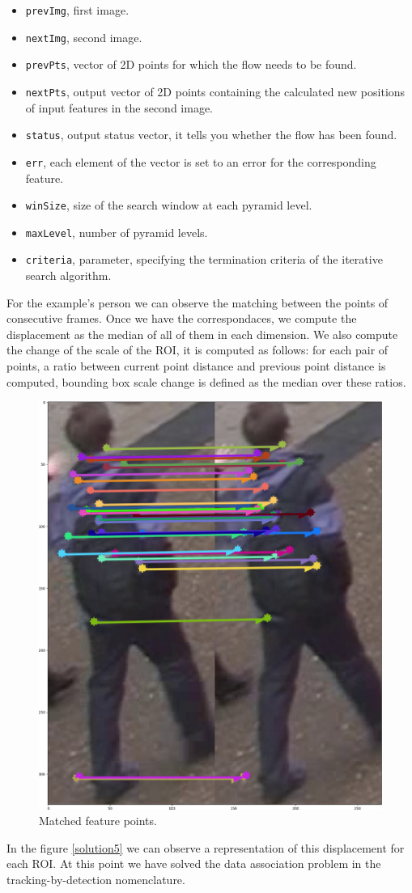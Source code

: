 \begin{itemize}

\item \texttt{prevImg}, first image.
\item \texttt{nextImg}, second image.
\item \texttt{prevPts}, vector of 2D points for which the flow needs to be found. 
\item \texttt{nextPts}, output vector of 2D points containing the calculated new positions of input features in the second image. 
\item \texttt{status}, output status vector, it tells you whether the flow has been found.  
\item \texttt{err}, each element of the vector is set to an error for the corresponding feature.
\item \texttt{winSize}, size of the search window at each pyramid level. 
\item \texttt{maxLevel}, number of pyramid levels.  
\item \texttt{criteria}, parameter, specifying the termination criteria of the iterative search algorithm.
\end{itemize}



For the example's person we can observe the matching between the points of consecutive frames. Once we have the correspondaces, we compute the displacement as the median of all of them in each dimension. We also compute the change of the scale of the ROI, it is computed as follows: for each pair of points, a ratio between current point distance and previous point distance is computed, bounding box scale change is defined as the median over these ratios.

\begin{figure}[hptb]
\centering         
\includegraphics[width=0.3\linewidth]{implementation/matching.png}
\caption{Matched feature points.} \label{solution4}
\end{figure}


In the figure \ref{solution5} we can observe a representation of this displacement for each ROI. At this point we have solved the data association problem in the tracking-by-detection nomenclature.

